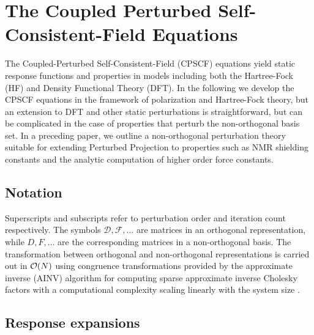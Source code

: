 \documentclass[prl,aps,letterpaper,twocolumn,showpacs,twocolumngrid,superbib]{revtex4}
\begin{document}
\section{The Coupled Perturbed Self-Consistent-Field Equations}

The Coupled-Perturbed Self-Consistent-Field (CPSCF) equations yield
static response functions and properties in models including both the 
Hartree-Fock (HF) and Density Functional Theory (DFT).  In the following
we develop the CPSCF equations in the framework of polarization and 
Hartree-Fock theory, but an extension to DFT and other static perturbations 
is straightforward, but can be complicated in the case of properties that 
perturb the non-orthogonal basis set.  In a preceding paper, we outline 
a non-orthogonal perturbation theory suitable for extending Perturbed Projection
to properties such as NMR shielding constants and the analytic computation of
higher order force constants.

\subsection{Notation}

Superscripts and subscripts refer to perturbation order and 
iteration count respectively. The symbols $\mathcal{D},\mathcal{F},\dots$
are matrices in an orthogonal representation, while
$D,F,\dots$ are the corresponding matrices in a non-orthogonal basis.
The transformation between orthogonal and non-orthogonal 
representations is carried out in ${\cal O}(N)$ using
congruence transformations \cite{JWilkinson65,GStewart73} provided 
by the approximate inverse (AINV) algorithm for computing  sparse 
approximate inverse Cholesky factors with a computational complexity
scaling linearly with the system size \cite{MBenzi95,MBenzi96,MBenzi01}.



\subsection{Response expansions}
\end{document}
